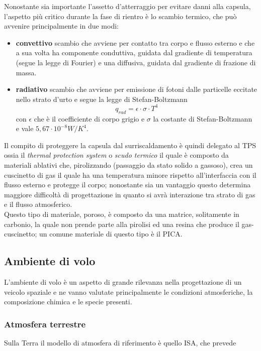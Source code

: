\documentclass[10pt]{article}
\begin{document}
Nonostante sia importante l'assetto d'atterraggio per evitare danni alla capsula, l'aspetto più critico durante la fase di rientro è lo scambio termico, che può avvenire principalmente in due modi:
\begin{itemize}
    \item \textbf{convettivo} \textrightarrow scambio che avviene per contatto tra corpo e flusso esterno e che a sua volta ha componente conduttiva, guidata dal gradiente di temperatura (segue la legge di Fourier) e una diffusiva, guidata dal gradiente di frazione di massa.
    \item \textbf{radiativo} \textrightarrow scambio che avviene  per emissione di fotoni dalle particelle eccitate nello strato d'urto e segue la legge di Stefan-Boltzmann 
    \begin{equation}
        q_{rad}=\epsilon \cdot \sigma \cdot T^4
    \end{equation}
    con $\epsilon$ che è il coefficiente di corpo grigio e $\sigma$ la costante di Stefan-Boltzmann e vale $5,67 \cdot 10^{-8} W/K^4$. 
\end{itemize}

Il compito di proteggere la capsula dal surriscaldamento è quindi delegato al TPS ossia il \textit{thermal protection system} o \textit{scudo termico} il quale è composto da materiali ablativi che, pirolizzando (passaggio da stato solido a gassoso), crea un cuscinetto di gas il quale ha una temperatura minore rispetto all'interfaccia con il flusso esterno e protegge il corpo; nonostante sia un vantaggio questo determina maggiore difficoltà di progettazione in quanto si avrà interazione tra strato di gas e il flusso atmosferico.\\
Questo tipo di materiale, poroso, è composto da una matrice, solitamente in carbonio, la quale non prende parte alla pirolisi ed una resina che produce il gas-cuscinetto; un comune materiale di questo tipo è il PICA.

\subsection{Ambiente di volo}
L'ambiente di volo è un aspetto di grande rilevanza nella progettazione di un veicolo spaziale e ne vanno valutate principalmente le condizioni atmosferiche, la composizione chimica e le specie presenti.

\subsubsection{Atmosfera terrestre}
Sulla Terra il modello di atmosfera di riferimento è quello ISA, che prevede 
\end{document}
